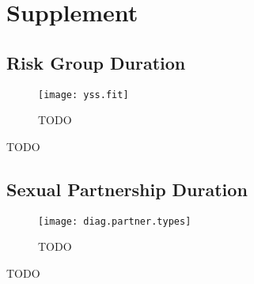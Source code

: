\section{Supplement}
\subsection{Risk Group Duration}\label{app.yss}
\begin{figure}[h]
	\centering\texttt{[image: yss.fit]}
  \caption{TODO}
	\label{fig:yss.fit}
\end{figure}
\begin{table}[h]
  \centering
  \caption{TODO}
  
  \label{tab:yss.adj}
\end{table}
\subsection{Sexual Partnership Duration}\label{app.partners}
\begin{figure}[h]
  \texttt{[image: diag.partner.types]}
  \caption{TODO}
  \label{fig:diag.partner.types}
\end{figure}
\begin{table}[h]
  \centering
  \caption{TODO}
  
  \label{tab:partners.fsw}
\end{table}
